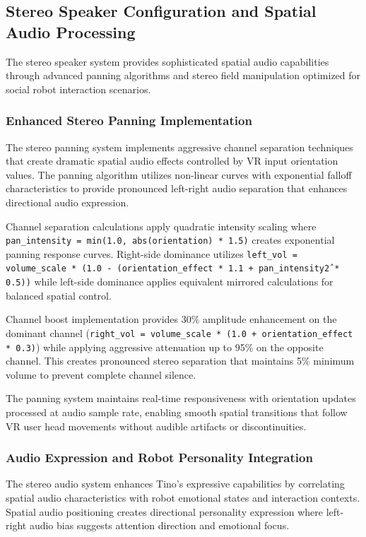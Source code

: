 \subsection{Stereo Speaker Configuration and Spatial Audio Processing}

The stereo speaker system provides sophisticated spatial audio capabilities through advanced panning algorithms and stereo field manipulation optimized for social robot interaction scenarios.

\subsubsection{Enhanced Stereo Panning Implementation}

The stereo panning system implements aggressive channel separation techniques that create dramatic spatial audio effects controlled by VR input orientation values. The panning algorithm utilizes non-linear curves with exponential falloff characteristics to provide pronounced left-right audio separation that enhances directional audio expression.

Channel separation calculations apply quadratic intensity scaling where \texttt{pan\_intensity = min(1.0, abs(orientation) * 1.5)} creates exponential panning response curves. Right-side dominance utilizes \texttt{left\_vol = volume\_scale * (1.0 - (orientation\_effect * 1.1 + pan\_intensity\^2 * 0.5))} while left-side dominance applies equivalent mirrored calculations for balanced spatial control.

Channel boost implementation provides 30\% amplitude enhancement on the dominant channel (\texttt{right\_vol = volume\_scale * (1.0 + orientation\_effect * 0.3)}) while applying aggressive attenuation up to 95\% on the opposite channel. This creates pronounced stereo separation that maintains 5\% minimum volume to prevent complete channel silence.

The panning system maintains real-time responsiveness with orientation updates processed at audio sample rate, enabling smooth spatial transitions that follow VR user head movements without audible artifacts or discontinuities.

\subsubsection{Audio Expression and Robot Personality Integration}

The stereo audio system enhances Tino's expressive capabilities by correlating spatial audio characteristics with robot emotional states and interaction contexts. Spatial audio positioning creates directional personality expression where left-right audio bias suggests attention direction and emotional focus.

